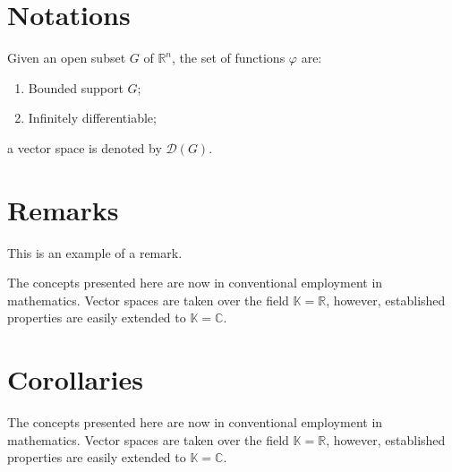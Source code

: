 \documentclass[
	11pt, %
	fleqn, %
	a4paper, %
]{LegrandOrangeBook}
\begin{document}

\section{Notations}

\begin{notation} %
	Given an open subset $G$ of $\mathbb{R}^n$, the set of functions $\varphi$ are:
	\begin{enumerate}
		\item Bounded support $G$;
		\item Infinitely differentiable;
	\end{enumerate}
	a vector space is denoted by $\mathcal{D}(G)$.
\end{notation}


\section{Remarks}

This is an example of a remark.

\begin{remark}
	The concepts presented here are now in conventional employment in mathematics. Vector spaces are taken over the field $\mathbb{K}=\mathbb{R}$, however, established properties are easily extended to $\mathbb{K}=\mathbb{C}$.
\end{remark}


\section{Corollaries}

\begin{corollary}[Corollary name] %
	The concepts presented here are now in conventional employment in mathematics. Vector spaces are taken over the field $\mathbb{K}=\mathbb{R}$, however, established properties are easily extended to $\mathbb{K}=\mathbb{C}$.
\end{corollary}

\end{document}

